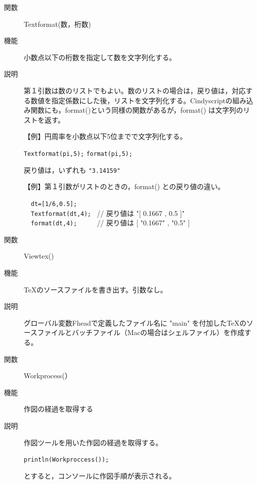 \documentclass[papersize,a4paper,12pt,uplatex]{jsarticle}
\begin{document}
\begin{description}
\vspace{\baselineskip}
\hypertarget{textformat}{}
\item[関数]  Textformat(数，桁数)
\item[機能]  小数点以下の桁数を指定して数を文字列化する。
\item[説明]  第１引数は数のリストでもよい。数のリストの場合は，戻り値は，対応する数値を指定係数にした後，リストを文字列化する。Cindyscriptの組み込み関数にも，format()という同様の関数があるが，format() は文字列のリストを返す。

\vspace{\baselineskip}
【例】円周率を小数点以下5位までで文字列化する。

\hspace{10mm} \verb|Textformat(pi,5);|
\hspace{10mm} \verb|format(pi,5);|
    
戻り値は，いずれも \verb|"3.14159"|

\vspace{\baselineskip}
【例】第１引数がリストのときの，format() との戻り値の違い。

\hspace{10mm} \verb|  dt=[1/6,0.5];|\\
\hspace{10mm} \verb|  Textformat(dt,4); | // 戻り値は "[ 0.1667 , 0.5 ]" \\
\hspace{10mm} \verb|  format(dt,4);     | // 戻り値は [ "0.1667" , "0.5" ] \\

    
 \vspace{\baselineskip}
\hypertarget{viewtex}{}
\item[関数]  Viewtex()
\item[機能]  \TeX のソースファイルを書き出す。引数なし。
\item[説明]  グローバル変数Fheadで定義したファイル名に "main" を付加した\TeX のソースファイルとバッチファイル（Macの場合はシェルファイル）を作成する。
 
\vspace{\baselineskip}
\hypertarget{workprocess}{}
\item[関数]  Workprocess(）
\item[機能]  作図の経過を取得する
\item[説明]  作図ツールを用いた作図の経過を取得する。

  \verb|println(Workproccess());|
  
  とすると，コンソールに作図手順が表示される。

\end{description}
\end{document}
